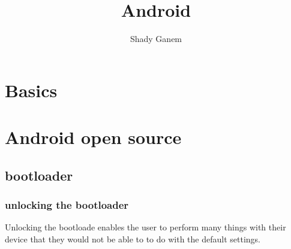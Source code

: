 \documentclass{book}
\title{Android}
\author{Shady Ganem}
\begin{document}
\maketitle
\tableofcontents

\part{Basics}

\part{Android open source}

\chapter{bootloader}

\section{unlocking the bootloader}
Unlocking the bootloade enables the user to perform many things with their device that they would not be able to to do with the default settings.\\
\end{document}
